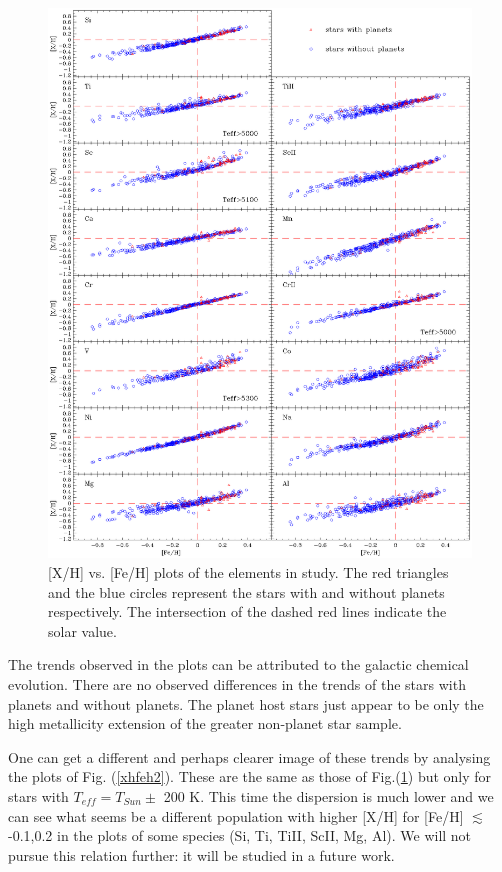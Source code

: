 \documentclass[dvips,12pt,a4paper]{report}
\begin{document}
{{\begin{figure}[h]
\centering
\includegraphics[width=16 cm, height=15 cm]{pics/parte4/xhfehfinal/xhfehtfinal.eps}
\caption[abundance gfx]{[X/H] vs. [Fe/H] plots of the elements in study. The red triangles and the blue circles represent the stars with and without planets respectively. The intersection of the dashed red lines indicate the solar value.}
\label{xhfeh1}
\end{figure}

The trends observed in the plots can be attributed to the galactic chemical evolution. There are no observed differences in the trends of the stars with planets and without planets. The planet host stars just appear to be only the high metallicity extension of the greater non-planet star sample. 

One can get a different and perhaps clearer image of these trends by analysing the plots of Fig. (\ref{xhfeh2}). These are the same as those of Fig.(\ref{xhfeh1}) but only for stars with $T_{eff}=T_{Sun}\pm$ 200 K. This time the dispersion is much lower and we can see what seems be a different population with higher [X/H] for [Fe/H] $\lesssim$ -0.1,0.2 in the plots of some species (Si, Ti, TiII, ScII, Mg, Al). %
We will not pursue this relation further: it will be studied in a future work. 

}}
\end{document}
